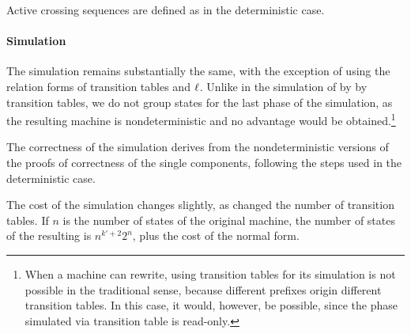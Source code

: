 Active crossing sequences are defined as in the deterministic case.

\paragraph{Simulation} The simulation remains substantially the same, with the exception of using the relation forms of transition tables and $\ell$.
Unlike in the simulation of \TNFA by \ODFA by transition tables, we do not group states for the last phase of the simulation, as the resulting machine is nondeterministic and no advantage would be obtained.\footnote{%
	When a machine can rewrite, using transition tables for its simulation is not possible in the traditional sense, because different prefixes origin different transition tables.
	In this case, it would, however, be possible, since the phase simulated via transition table is read-only.}

The correctness of the simulation derives from the nondeterministic versions of the proofs of correctness of the single components, following the steps used in the deterministic case.

The cost of the simulation changes slightly, as changed the number of transition tables.
If $n$ is the number of states of the original machine, the number of states of the resulting \ONFA is $n^{k'+2}2^n$, plus the cost of the normal form.
